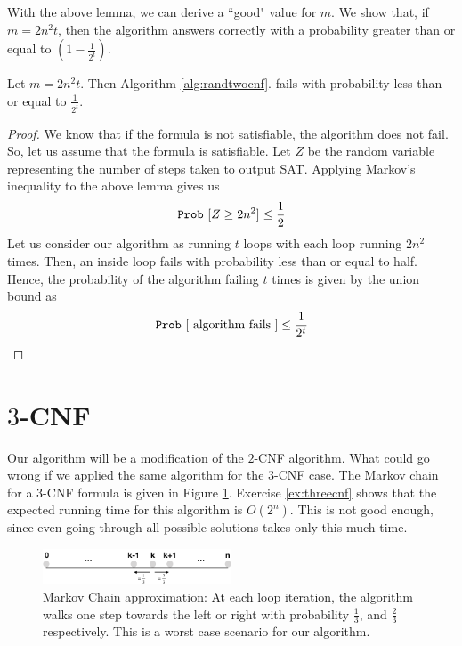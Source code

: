 With the above lemma, we can derive a ``good" value for $m$. We show that, if $m=2n^2t$, then the algorithm answers correctly with a probability greater than or equal to $(1 - \frac{1}{2^t})$. 
\begin{theorem}
Let $m = 2n^2t$. Then Algorithm \ref{alg:randtwocnf}. fails with probability less than or equal to $\frac{1}{2^t}$.
\end{theorem}
\begin{proof}
We know that if the formula is not satisfiable, the algorithm does not fail. So, let us assume that the formula is satisfiable. Let $Z$ be the random variable representing the number of steps taken to output SAT. Applying Markov's inequality to the above lemma gives us
\[
\mathtt{Prob}~[Z \geq 2n^2]  \leq \frac{1}{2}
\]
Let us consider our algorithm as running $t$ loops with each loop running $2n^2$ times. Then, an inside loop fails with probability less than or equal to half. Hence, the probability of the algorithm failing $t$ times is given by the union bound as 
\[
\mathtt{Prob}~[\text{ algorithm fails }] \leq \frac{1}{2^t}
\]


\end{proof}

\section{$3$-CNF}
Our algorithm will be a modification of the $2$-CNF algorithm. What could go wrong if we applied the same algorithm for the $3$-CNF case. The Markov chain for a $3$-CNF formula is given in Figure \ref{fig:threecnfwalk}. Exercise \ref{ex:threecnf} shows that the expected running time for this algorithm is $O(2^n)$. This is not good enough, since even going through all possible solutions takes only this much time. 

\begin{figure}
\includegraphics[width=0.5\textwidth]{threecnfwalk}
\caption{Markov Chain approximation: At each loop iteration, the algorithm walks one step towards the left or right with probability $\frac{1}{3}$, and $\frac{2}{3}$ respectively. This is a worst case scenario for our algorithm.}
\label{fig:threecnfwalk}
\end{figure}

